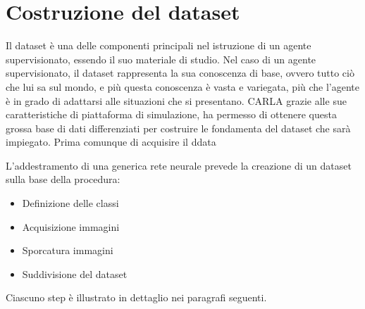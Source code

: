 \documentclass[14pt]{extarticle}
\begin{document}
\section{Costruzione del dataset}
Il dataset è una delle componenti principali nel istruzione di un agente supervisionato, essendo il suo materiale di studio. 
Nel caso di un agente supervisionato, il dataset rappresenta la sua conoscenza di base, ovvero tutto ciò che lui sa sul mondo, e più questa conoscenza è vasta e variegata, più che l'agente è in grado di adattarsi alle situazioni che si presentano.
CARLA grazie alle sue caratteristiche di piattaforma di simulazione, ha permesso di ottenere questa grossa base di dati differenziati per costruire le fondamenta del dataset che sarà impiegato.
Prima comunque di acquisire il ddata

L'addestramento di una generica rete neurale prevede la creazione di un dataset sulla
base della procedura:
\begin{itemize}
\item Definizione delle classi
\item Acquisizione immagini
\item Sporcatura immagini
\item Suddivisione del dataset
\end{itemize}

Ciascuno step è illustrato in dettaglio nei paragrafi seguenti.

\end{document}
